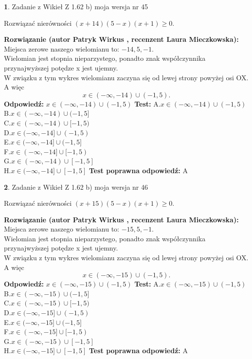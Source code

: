 \documentclass[12pt, a4paper]{article}
\theoremstyle{definition} %
\newtheorem{zad}{}
\newcommand{\zadStart}[1]{\begin{zad}#1\newline}
\newcommand{\zadStop}{\end{zad}}
\newcommand{\rozwStart}[2]{\noindent \textbf{Rozwiązanie (autor #1 , recenzent #2): }\newline}
\newcommand{\rozwStop}{\newline}
\newcommand{\odpStart}{\noindent \textbf{Odpowiedź:}\newline}
\newcommand{\odpStop}{\newline}
\newcommand{\testStart}{\noindent \textbf{Test:}\newline}
\newcommand{\testStop}{\newline}
\newcommand{\kluczStart}{\noindent \textbf{Test poprawna odpowiedź:}\newline}
\newcommand{\kluczStop}{\newline}
\begin{document}
\zadStart{Zadanie z Wikieł Z 1.62 b) moja wersja nr 45}

Rozwiązać nierówności $(x+14)(5-x)(x+1)\ge0$.
\zadStop
\rozwStart{Patryk Wirkus}{Laura Mieczkowska}
Miejsca zerowe naszego wielomianu to: $-14, 5, -1$.\\
Wielomian jest stopnia nieparzystego, ponadto znak współczynnika przy\linebreak najwyższej potędze x jest ujemny.\\ W związku z tym wykres wielomianu zaczyna się od lewej strony powyżej osi OX. A więc $$x \in (-\infty,-14) \cup (-1,5).$$
\rozwStop
\odpStart
$x \in (-\infty,-14) \cup (-1,5)$
\odpStop
\testStart
A.$x \in (-\infty,-14) \cup (-1,5)$\\
B.$x \in (-\infty,-14) \cup (-1,5]$\\
C.$x \in (-\infty,-14) \cup [-1,5)$\\
D.$x \in (-\infty,-14] \cup (-1,5)$\\
E.$x \in (-\infty,-14] \cup (-1,5]$\\
F.$x \in (-\infty,-14] \cup [-1,5)$\\
G.$x \in (-\infty,-14) \cup [-1,5]$\\
H.$x \in (-\infty,-14] \cup [-1,5]$
\testStop
\kluczStart
A
\kluczStop



\zadStart{Zadanie z Wikieł Z 1.62 b) moja wersja nr 46}

Rozwiązać nierówności $(x+15)(5-x)(x+1)\ge0$.
\zadStop
\rozwStart{Patryk Wirkus}{Laura Mieczkowska}
Miejsca zerowe naszego wielomianu to: $-15, 5, -1$.\\
Wielomian jest stopnia nieparzystego, ponadto znak współczynnika przy\linebreak najwyższej potędze x jest ujemny.\\ W związku z tym wykres wielomianu zaczyna się od lewej strony powyżej osi OX. A więc $$x \in (-\infty,-15) \cup (-1,5).$$
\rozwStop
\odpStart
$x \in (-\infty,-15) \cup (-1,5)$
\odpStop
\testStart
A.$x \in (-\infty,-15) \cup (-1,5)$\\
B.$x \in (-\infty,-15) \cup (-1,5]$\\
C.$x \in (-\infty,-15) \cup [-1,5)$\\
D.$x \in (-\infty,-15] \cup (-1,5)$\\
E.$x \in (-\infty,-15] \cup (-1,5]$\\
F.$x \in (-\infty,-15] \cup [-1,5)$\\
G.$x \in (-\infty,-15) \cup [-1,5]$\\
H.$x \in (-\infty,-15] \cup [-1,5]$
\testStop
\kluczStart
A
\kluczStop
\end{document}
